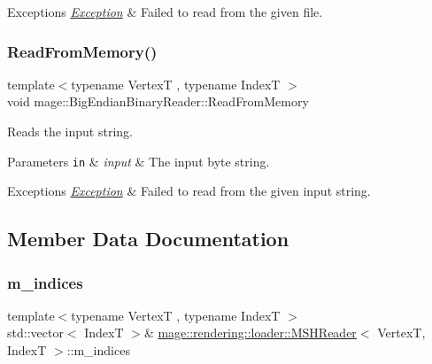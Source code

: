 \begin{DoxyExceptions}{Exceptions}
{\em \mbox{\hyperlink{classmage_1_1_exception}{Exception}}} & Failed to read from the given file. \\
\hline
\end{DoxyExceptions}
\mbox{\label{classmage_1_1rendering_1_1loader_1_1_m_s_h_reader_afc48490dca5042078726a1ec3fe7abe7}} 
\subsubsection{\texorpdfstring{Read\+From\+Memory()}{ReadFromMemory()}}
{\footnotesize\ttfamily template$<$typename VertexT , typename IndexT $>$ \\
void mage\+::\+Big\+Endian\+Binary\+Reader\+::\+Read\+From\+Memory}

Reads the input string.


\begin{DoxyParams}[1]{Parameters}
\mbox{\tt in}  & {\em input} & The input byte string. \\
\hline
\end{DoxyParams}

\begin{DoxyExceptions}{Exceptions}
{\em \mbox{\hyperlink{classmage_1_1_exception}{Exception}}} & Failed to read from the given input string. \\
\hline
\end{DoxyExceptions}


\subsection{Member Data Documentation}
\mbox{\label{classmage_1_1rendering_1_1loader_1_1_m_s_h_reader_acf3ae948f5bb927a167bbb2e5d618916}} 
\subsubsection{\texorpdfstring{m\+\_\+indices}{m\_indices}}
{\footnotesize\ttfamily template$<$typename VertexT , typename IndexT $>$ \\
std\+::vector$<$ IndexT $>$\& \mbox{\hyperlink{classmage_1_1rendering_1_1loader_1_1_m_s_h_reader}{mage\+::rendering\+::loader\+::\+M\+S\+H\+Reader}}$<$ VertexT, IndexT $>$\+::m\+\_\+indices\hspace{0.3cm}{\ttfamily [private]}}

